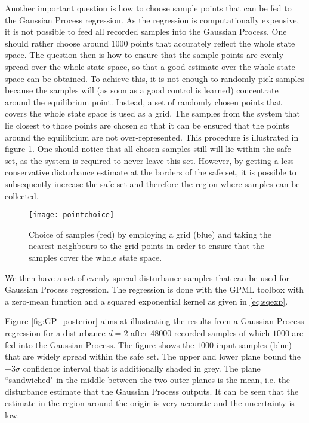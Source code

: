\documentclass[../main.tex]{subfiles}
\begin{document}
Another important question is how to choose sample points that can be fed to the Gaussian Process regression. As the regression is computationally expensive, it is not possible to feed all recorded samples into the Gaussian Process. One should rather choose around $1000$ points that accurately reflect the whole state space. The question then is how to ensure that the sample points are evenly spread over the whole state space, so that a good estimate over the whole state space can be obtained. To achieve this, it is not enough to randomly pick samples because the samples will (as soon as a good control is learned) concentrate around the equilibrium point. Instead, a set of randomly chosen points that covers the whole state space is used as a grid. The samples from the system that lie closest to those points are chosen so that it can be ensured that the points around the equilibrium are not over-represented.  This procedure is illustrated in figure \ref{fig:pointchoice}. One should notice that all chosen samples still will lie within the safe set, as the system is required to never leave this set. However, by getting a less conservative disturbance estimate at the borders of the safe set, it is possible to subsequently increase the safe set and therefore the region where samples can be collected.

\begin{figure}
    \centering
    \texttt{[image: pointchoice]}
        \caption{Choice of samples (red) by employing a grid (blue) and taking the nearest neighbours to the grid points in order to ensure that the samples cover the whole state space.}  \label{fig:pointchoice}
\end{figure}

We then have a set of evenly spread disturbance samples that can be used for Gaussian Process regression. The regression is done with the GPML toolbox \cite{Rasmussen:2010:GPM:1756006.1953029} with a zero-mean function and a squared exponential kernel as given in \eqref{eq:sqexp}.

Figure \ref{fig:GP_posterior} aims at illustrating the results from a Gaussian Process regression for a disturbance $d = 2$ after $48000$ recorded samples of which $1000$ are fed into the Gaussian Process. The figure shows the $1000$ input samples (blue) that are widely spread within the safe set. The upper and lower plane bound the $\pm 3\sigma$ confidence interval that is additionally shaded in grey. The plane ``sandwiched" in the middle between the two outer planes is the mean, i.e. the disturbance estimate that the Gaussian Process outputs. It can be seen that the estimate in the region around the origin is very accurate and the uncertainty is low.
\end{document}
